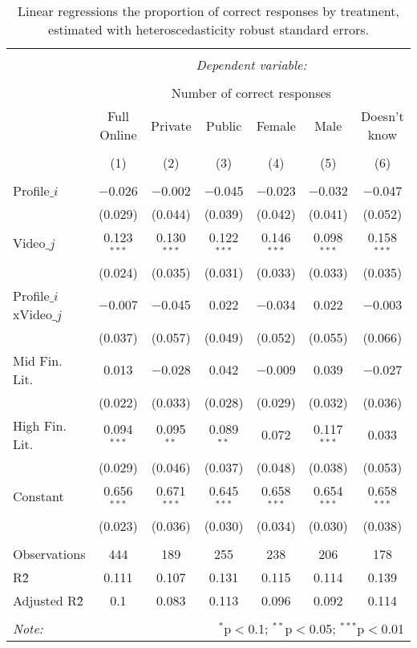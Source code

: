 
\begin{table}[!htbp] \centering 
  \caption{ Linear regressions the proportion of correct responses by treatment, estimated with 
            heteroscedasticity robust standard errors.} 
  \label{tbl:comparison_lusardi} 
\begin{tabular}{@{\extracolsep{5pt}}lcccccc} 
\\[-1.8ex]\hline 
\hline \\[-1.8ex] 
 & \multicolumn{6}{c}{\textit{Dependent variable:}} \\ 
\cline{2-7} 
\\[-1.8ex] & \multicolumn{6}{c}{Number of correct responses} \\ 
 & Full Online & Private & Public & Female & Male & Doesn't know \\ 
\\[-1.8ex] & (1) & (2) & (3) & (4) & (5) & (6)\\ 
\hline \\[-1.8ex] 
 Profile$\_i$ & $-$0.026 & $-$0.002 & $-$0.045 & $-$0.023 & $-$0.032 & $-$0.047 \\ 
  & (0.029) & (0.044) & (0.039) & (0.042) & (0.041) & (0.052) \\ 
  Video$\_j$ & 0.123$^{***}$ & 0.130$^{***}$ & 0.122$^{***}$ & 0.146$^{***}$ & 0.098$^{***}$ & 0.158$^{***}$ \\ 
  & (0.024) & (0.035) & (0.031) & (0.033) & (0.033) & (0.035) \\ 
  Profile$\_i$xVideo$\_j$ & $-$0.007 & $-$0.045 & 0.022 & $-$0.034 & 0.022 & $-$0.003 \\ 
  & (0.037) & (0.057) & (0.049) & (0.052) & (0.055) & (0.066) \\ 
  Mid Fin. Lit. & 0.013 & $-$0.028 & 0.042 & $-$0.009 & 0.039 & $-$0.027 \\ 
  & (0.022) & (0.033) & (0.028) & (0.029) & (0.032) & (0.036) \\ 
  High Fin. Lit. & 0.094$^{***}$ & 0.095$^{**}$ & 0.089$^{**}$ & 0.072 & 0.117$^{***}$ & 0.033 \\ 
  & (0.029) & (0.046) & (0.037) & (0.048) & (0.038) & (0.053) \\ 
  Constant & 0.656$^{***}$ & 0.671$^{***}$ & 0.645$^{***}$ & 0.658$^{***}$ & 0.654$^{***}$ & 0.658$^{***}$ \\ 
  & (0.023) & (0.036) & (0.030) & (0.034) & (0.030) & (0.038) \\ 
 \hline \\[-1.8ex] 
Observations & 444 & 189 & 255 & 238 & 206 & 178 \\ 
R\^2 & 0.111 & 0.107 & 0.131 & 0.115 & 0.114 & 0.139 \\ 
Adjusted R\^2 & 0.1 & 0.083 & 0.113 & 0.096 & 0.092 & 0.114 \\ 
\hline 
\hline \\[-1.8ex] 
\textit{Note:}  & \multicolumn{6}{r}{$^{*}$p$<$0.1; $^{**}$p$<$0.05; $^{***}$p$<$0.01} \\ 
\end{tabular} 
\end{table} 
